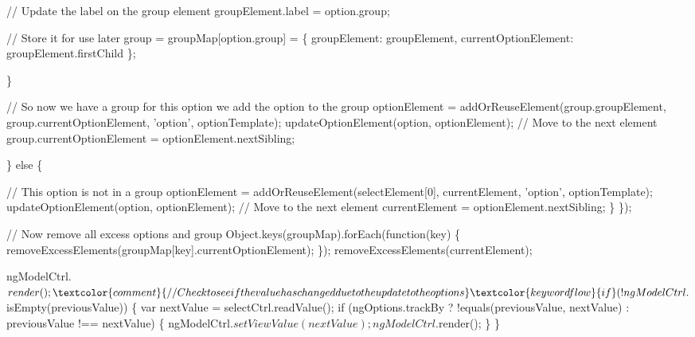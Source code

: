 \begin{DoxyCodeInclude}
{{{              \textcolor{comment}{// Update the label on the group element}
              groupElement.label = option.group;

              \textcolor{comment}{// Store it for use later}
              group = groupMap[option.group] = \{
                groupElement: groupElement,
                currentOptionElement: groupElement.firstChild
              \};

            \}

            \textcolor{comment}{// So now we have a group for this option we add the option to the group}
            optionElement = addOrReuseElement(group.groupElement,
                                              group.currentOptionElement,
                                              \textcolor{stringliteral}{'option'},
                                              optionTemplate);
            updateOptionElement(option, optionElement);
            \textcolor{comment}{// Move to the next element}
            group.currentOptionElement = optionElement.nextSibling;

          \} \textcolor{keywordflow}{else} \{

            \textcolor{comment}{// This option is not in a group}
            optionElement = addOrReuseElement(selectElement[0],
                                              currentElement,
                                              \textcolor{stringliteral}{'option'},
                                              optionTemplate);
            updateOptionElement(option, optionElement);
            \textcolor{comment}{// Move to the next element}
            currentElement = optionElement.nextSibling;
          \}
        \});


        \textcolor{comment}{// Now remove all excess options and group}
        Object.keys(groupMap).forEach(\textcolor{keyword}{function}(key) \{
          removeExcessElements(groupMap[key].currentOptionElement);
        \});
        removeExcessElements(currentElement);

        ngModelCtrl.$render();

        \textcolor{comment}{// Check to see if the value has changed due to the update to the options}
        \textcolor{keywordflow}{if} (!ngModelCtrl.$isEmpty(previousValue)) \{
          var nextValue = selectCtrl.readValue();
          \textcolor{keywordflow}{if} (ngOptions.trackBy ? !equals(previousValue, nextValue) : previousValue !== nextValue) \{
            ngModelCtrl.$setViewValue(nextValue);
            ngModelCtrl.$render();
          \}
        \}

}}}
\end{DoxyCodeInclude}
